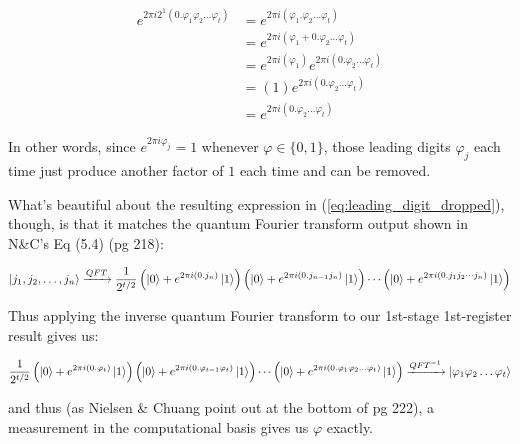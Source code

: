 \documentclass{article}
\begin{document}
\begin{enumerate}[label=\textbf{(\arabic*)}]
\begin{align}
    e^{2\pi i 2^1 (0.\varphi_{1}\varphi_2\ldots\varphi_{t})}
    &=
    e^{2\pi i (\varphi_{1}.\varphi_2\ldots\varphi_{t})}\\
    &=
    e^{2\pi i (\varphi_{1} + 0.\varphi_2\ldots\varphi_{t})}\\
    &=
    e^{2\pi i (\varphi_{1})}
    e^{2\pi i ( 0.\varphi_2\ldots\varphi_{t})}\\
    &=
    (1)
    e^{2\pi i ( 0.\varphi_2\ldots\varphi_{t})}\\
    &=
    e^{2\pi i ( 0.\varphi_2\ldots\varphi_{t})}
\end{align}

In other words, since $e^{2\pi i \varphi_j} = 1$ whenever $\varphi\in \{0, 1\}$, those leading digits $\varphi_j$ each time just produce another factor of $1$ each time and can be removed.

\vspace{0.1in}

What's beautiful about the resulting expression in (\ref{eq:leading_digit_dropped}), though, is that it matches the quantum Fourier transform output shown in N\&C's Eq (5.4) (pg 218):

\begin{align}
    \ket{j_1, j_2, \ldots, j_n}
    \xrightarrow{QFT}
    \frac{1}{2^{t/2}}\left(\ket{0}+e^{2\pi i (0.j_n)}\ket{1}\right)
      \left(\ket{0}+e^{2\pi i (0.j_{n-1}j_{n})}\ket{1}\right)
      \cdots
      \left(\ket{0}+e^{2\pi i (0.j_1 j_2\cdots j_{n})}\ket{1}\right)
\end{align}

Thus applying the inverse quantum Fourier transform to our 1st-stage 1st-register result gives us:

\begin{align}
    \frac{1}{2^{t/2}}\left(\ket{0}+e^{2\pi i (0.\varphi_{t})}\ket{1}\right)
      \left(\ket{0}+e^{2\pi i (0.\varphi_{t-1}\varphi_{t})}\ket{1}\right)
      \cdots
      \left(\ket{0}+e^{2\pi i (0.\varphi_1\varphi_2\ldots\varphi_{t})}\ket{1}\right)
    \xrightarrow{QFT^{-1}}
    \ket{\varphi_1\varphi_2\ldots\varphi_{t}}
\end{align}

and thus (as Nielsen \& Chuang point out at the bottom of pg 222), a measurement in the computational basis gives us $\varphi$ exactly.

\clearpage

\end{enumerate}

\printbibliography
\end{document}
